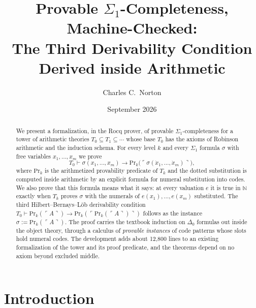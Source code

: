 \documentclass[11pt]{article}
\title{Provable $\Sigma_1$-Completeness, Machine-Checked:\\
The Third Derivability Condition Derived inside Arithmetic}
\author{Charles C.\ Norton}
\date{September 2026}
\theoremstyle{plain}
\theoremstyle{definition}
\theoremstyle{remark}
\newcommand{\N}{\mathbb{N}}
\newcommand{\T}[1]{T_{#1}}
\newcommand{\Prv}{\mathrm{Pr}}
\newcommand{\gn}[1]{\ulcorner #1 \urcorner}
\newcommand{\Ddelta}{\Delta_0}
\begin{document}
\maketitle

\begin{abstract}
We present a formalization, in the Rocq prover, of provable
$\Sigma_1$-completeness for a tower of arithmetic theories
$\T0 \subseteq \T1 \subseteq \cdots$ whose base $\T0$ has the axioms of
Robinson arithmetic and the induction schema.  For every level $k$ and
every $\Sigma_1$ formula $\sigma$ with free variables
$x_1,\dots,x_m$ we prove
\[
  \T0 \vdash \sigma(x_1,\dots,x_m) \to
  \Prv_k\bigl(\gn{\sigma(\dot x_1,\dots,\dot x_m)}\bigr),
\]
where $\Prv_k$ is the arithmetized provability predicate of $\T{k}$ and
the dotted substitution is computed inside arithmetic by an explicit
formula for numeral substitution into codes.  We also prove that this
formula means what it says: at every valuation $e$ it is true in $\N$
exactly when $\T{k}$ proves $\sigma$ with the numerals of
$e(x_1),\dots,e(x_m)$ substituted.  The third Hilbert--Bernays--L\"ob
derivability condition
$\T0 \vdash \Prv_k(\gn{A}) \to \Prv_k(\gn{\Prv_k(\gn{A})})$ follows as
the instance $\sigma := \Prv_k(\gn{A})$.  The proof carries the
textbook induction on $\Ddelta$ formulas out inside the object theory,
through a calculus of \emph{provable instances} of code patterns whose
slots hold numeral codes.  The development adds about 12{,}800 lines to
an existing formalization of the tower and its proof predicate, and the
theorems depend on no axiom beyond excluded middle.
\end{abstract}

\section{Introduction}\label{sec:intro}
\end{document}
